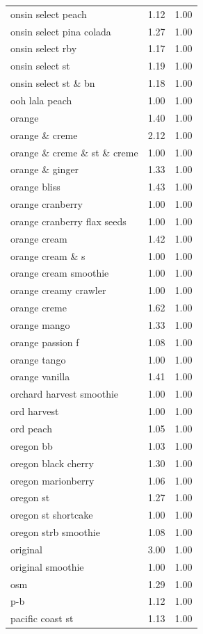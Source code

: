 \begin{table}
\begin{tabular}{lrr}
onsin select peach & 1.12 & 1.00 \\
onsin select pina colada & 1.27 & 1.00 \\
onsin select rby & 1.17 & 1.00 \\
onsin select st & 1.19 & 1.00 \\
onsin select st \& bn & 1.18 & 1.00 \\
ooh lala peach & 1.00 & 1.00 \\
orange & 1.40 & 1.00 \\
orange \& creme & 2.12 & 1.00 \\
orange \& creme \& st \& creme & 1.00 & 1.00 \\
orange \& ginger & 1.33 & 1.00 \\
orange bliss & 1.43 & 1.00 \\
orange cranberry & 1.00 & 1.00 \\
orange cranberry flax seeds & 1.00 & 1.00 \\
orange cream & 1.42 & 1.00 \\
orange cream \& s & 1.00 & 1.00 \\
orange cream smoothie & 1.00 & 1.00 \\
orange creamy crawler & 1.00 & 1.00 \\
orange creme & 1.62 & 1.00 \\
orange mango & 1.33 & 1.00 \\
orange passion f & 1.08 & 1.00 \\
orange tango & 1.00 & 1.00 \\
orange vanilla & 1.41 & 1.00 \\
orchard harvest smoothie & 1.00 & 1.00 \\
ord harvest & 1.00 & 1.00 \\
ord peach & 1.05 & 1.00 \\
oregon bb & 1.03 & 1.00 \\
oregon black cherry & 1.30 & 1.00 \\
oregon marionberry & 1.06 & 1.00 \\
oregon st & 1.27 & 1.00 \\
oregon st shortcake & 1.00 & 1.00 \\
oregon strb smoothie & 1.08 & 1.00 \\
original & 3.00 & 1.00 \\
original smoothie & 1.00 & 1.00 \\
osm & 1.29 & 1.00 \\
p-b & 1.12 & 1.00 \\
pacific coast st & 1.13 & 1.00 \\

\end{tabular}
\end{table}
